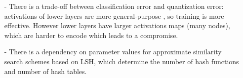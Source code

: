 \documentclass[conference]{IEEEtran}
\begin{document}


 
 
 
\begin{itemize}



\item[-]  There is a trade-off between classification error and quantization error: activations of lower layers are more general-purpose \cite{DBLP:journals/corr/YosinskiCBL14}, so training is more effective. However lower layers have larger  activations maps (many nodes), which are harder to encode which leads to a compromise. 
	

\item[-]  There is a dependency on parameter values  for approximate similarity search schemes based on LSH, which determine the number of hash functions and number of hash tables.  
 
\end{itemize}
\end{document}
